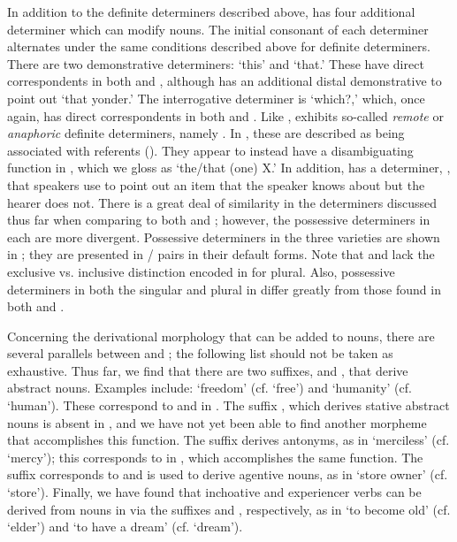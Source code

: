 \documentclass[output=paper,modfonts,nonflat,
hidelinks
]{langsci/langscibook}
\begin{document}
  \largerpage
 In addition to the definite determiners described above,  has four additional determiner which can modify nouns. The initial consonant of each determiner alternates under the same conditions described above for definite determiners. There are two demonstrative determiners:  `this' and  `that.' These have direct correspondents in both  and , although  has an additional distal demonstrative to point out `that yonder.' The  interrogative determiner is  `which?,' which, once again, has direct correspondents in both  and . Like ,  exhibits so-called \textit{remote} or \textit{anaphoric} definite determiners, namely . In , these are described as being associated with  referents (\citealt{Lecarme2008,Tosco1994}). They appear to instead have a disambiguating function in , which we gloss as `the/that (one) X.' In addition,  has a determiner, , that speakers use to point out an item that the speaker knows about but the hearer does not. There is a great deal of similarity in the determiners discussed thus far when comparing  to both  and ; however, the possessive determiners in each are more divergent. Possessive determiners in the three varieties are shown in ; they are presented in / pairs in their default forms. Note that  and  lack the exclusive vs. inclusive distinction encoded in  for  plural. Also,   possessive determiners in both the singular and plural in  differ greatly from those found in both  and .
 
 
 Concerning the derivational morphology that can be added to nouns, there are several parallels between  and ; the following list should not be taken as exhaustive. Thus far, we find that there are two  suffixes, \mbox{} and , that derive abstract nouns. Examples include:  `freedom' (cf.  `free') and  `humanity' (cf.  `human'). These correspond to \mbox{} and  in . The  suffix , which derives stative abstract nouns is absent in , and we have not yet been able to find another morpheme that accomplishes this function. The  suffix  derives antonyms, as in  `merciless' (cf.  `mercy'); this corresponds to  in , which accomplishes the same function. The  suffix  corresponds to   and is used to derive agentive nouns, as in  `store owner' (cf.  `store'). Finally, we have found that inchoative and experiencer verbs can be derived from nouns in  via the suffixes  and , respectively, as in  `to become old' (cf.  `elder') and  `to have a dream' (cf.  `dream'). 
 
\end{document}
